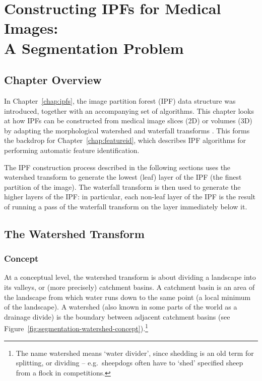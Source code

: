 \chapter[Constructing IPFs for Medical Images: A Segmentation Problem]{Constructing IPFs for Medical Images:\\A Segmentation Problem}
\label{chap:segmentation}

\section{Chapter Overview}

In Chapter~\ref{chap:ipfs}, the image partition forest (IPF) data structure was introduced, together with an accompanying set of algorithms. This chapter looks at how IPFs can be constructed from medical image slices (2D) or volumes (3D) by adapting the morphological watershed and waterfall transforms \cite{beucher94,marcotegui05}. This forms the backdrop for Chapter~\ref{chap:featureid}, which describes IPF algorithms for performing automatic feature identification.

The IPF construction process described in the following sections uses the watershed transform to generate the lowest (leaf) layer of the IPF (the finest partition of the image). The waterfall transform is then used to generate the higher layers of the IPF: in particular, each non-leaf layer of the IPF is the result of running a pass of the waterfall transform on the layer immediately below it.

\section{The Watershed Transform}

\subsection{Concept}

At a conceptual level, the watershed transform is about dividing a landscape into its valleys, or (more precisely) catchment basins. A catchment basin is an area of the landscape from which water runs down to the same point (a local minimum of the landscape). A watershed (also known in some parts of the world as a drainage divide) is the boundary between adjacent catchment basins (see Figure~\ref{fig:segmentation-watershed-concept}).\footnote{The name watershed means `water divider', since shedding is an old term for splitting, or dividing -- e.g.~sheepdogs often have to `shed' specified sheep from a flock in competitions.}

